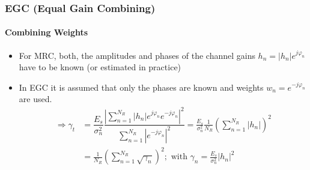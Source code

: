 \documentclass[a4paper, 10pt]{article}
\begin{document}
\subsubsection{EGC (Equal Gain Combining)}

\paragraph{Combining Weights}
\begin{itemize}
	\item For MRC, both, the amplitudes and phases of the channel gains $h_n=|h_n|e^{j\varphi_n}$ have to be known (or estimated in practice)
	\item In EGC it is assumed that only the phases are known and weights $w_n=e^{-j\varphi_n}$ are used.
\begin{align*}
	\Rightarrow \gamma_t &=\dfrac{E_s}{\sigma_n^2}\dfrac{\left|\sum\limits_{n=1}^{N_R}|h_n|e^{j\varphi_n}e^{-j\varphi_n}\right|^2}{\sum\limits^{N_R}_{n=1}\left|e^{-j\varphi_n}\right|^2}
	=\frac{E_s}{\sigma_n^2}\frac{1}{N_R}\left(\sum\limits^{N_R}_{n=1}|h_n|\right)^2\\
	&=\frac{1}{N_R}\left(\sum\limits_{n=1}^{N_R}\sqrt{\gamma_n}\right)^2;\text{  with  }\gamma_n=\frac{E_s}{\sigma_n^2}|h_n|^2
\end{align*}
\end{itemize}
\end{document}
